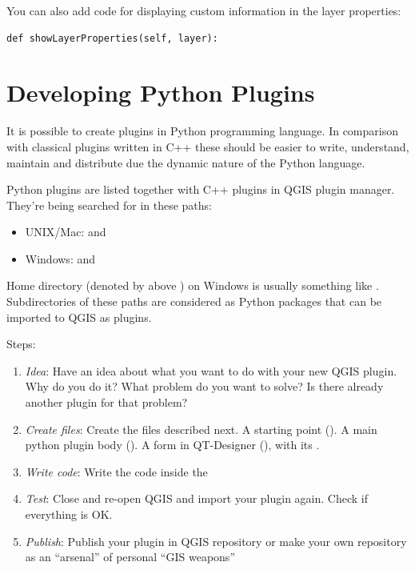 \documentclass[letterpaper,10pt,english]{manual}
\begin{document}
You can also add code for displaying custom information in the layer properties:

\begin{Verbatim}[commandchars=@\[\]]
def showLayerProperties(self, layer):
\end{Verbatim}

\resetcurrentobjects
\hypertarget{--doc-plugins}{}

\hypertarget{plugins}{}\chapter{Developing Python Plugins}

It is possible to create plugins in Python programming language. In comparison with classical plugins written in C++ these should be easier to write,
understand, maintain and distribute due the dynamic nature of the Python language.

Python plugins are listed together with C++ plugins in QGIS plugin manager. They're being searched for in these paths:
\begin{itemize}
\item {} 
UNIX/Mac:  and 

\item {} 
Windows:  and 

\end{itemize}

Home directory (denoted by above \code{\textasciitilde{}}) on Windows is usually something like .
Subdirectories of these paths are considered as Python packages that can be imported to QGIS as plugins.

Steps:
\begin{enumerate}
\item {} 
\emph{Idea}: Have an idea about what you want to do with your new QGIS plugin.
Why do you do it?
What problem do you want to solve?
Is there already another plugin for that problem?

\item {} 
\emph{Create files}: Create the files described next.
A starting point ().
A main python plugin body ().
A form in QT-Designer (), with its .

\item {} 
\emph{Write code}: Write the code inside the 

\item {} 
\emph{Test}: Close and re-open QGIS and import your plugin again. Check if everything is OK.

\item {} 
\emph{Publish}: Publish your plugin in QGIS repository or make your own repository as an ``arsenal'' of personal ``GIS weapons''

\end{enumerate}
\end{document}
